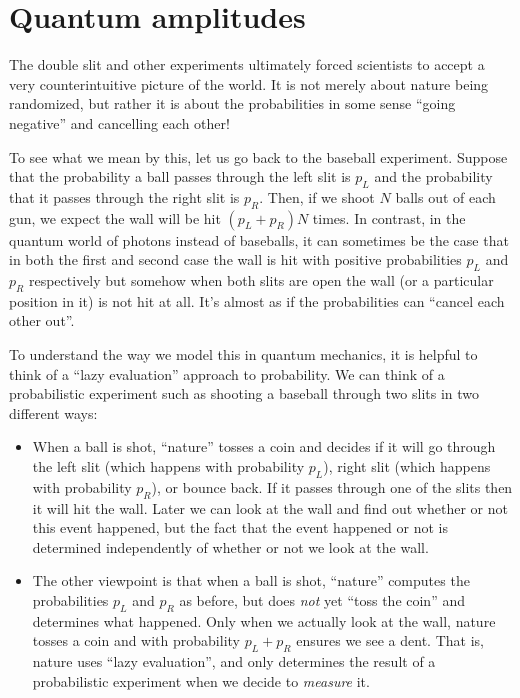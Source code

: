 \section{Quantum amplitudes}\label{Quantum-amplitudes}

The double slit and other experiments ultimately forced scientists to
accept a very counterintuitive picture of the world. It is not merely
about nature being randomized, but rather it is about the probabilities
in some sense ``going negative'' and cancelling each other!

To see what we mean by this, let us go back to the baseball experiment.
Suppose that the probability a ball passes through the left slit is
\(p_L\) and the probability that it passes through the right slit is
\(p_R\). Then, if we shoot \(N\) balls out of each gun, we expect the
wall will be hit \((p_L+p_R)N\) times. In contrast, in the quantum world
of photons instead of baseballs, it can sometimes be the case that in
both the first and second case the wall is hit with positive
probabilities \(p_L\) and \(p_R\) respectively but somehow when both
slits are open the wall (or a particular position in it) is not hit at
all. It's almost as if the probabilities can ``cancel each other out''.

To understand the way we model this in quantum mechanics, it is helpful
to think of a ``lazy evaluation'' approach to probability. We can think
of a probabilistic experiment such as shooting a baseball through two
slits in two different ways:

\begin{itemize}
\item
  When a ball is shot, ``nature'' tosses a coin and decides if it will
  go through the left slit (which happens with probability \(p_L\)),
  right slit (which happens with probability \(p_R\)), or bounce back.
  If it passes through one of the slits then it will hit the wall. Later
  we can look at the wall and find out whether or not this event
  happened, but the fact that the event happened or not is determined
  independently of whether or not we look at the wall.
\item
  The other viewpoint is that when a ball is shot, ``nature'' computes
  the probabilities \(p_L\) and \(p_R\) as before, but does \emph{not}
  yet ``toss the coin'' and determines what happened. Only when we
  actually look at the wall, nature tosses a coin and with probability
  \(p_L+p_R\) ensures we see a dent. That is, nature uses ``lazy
  evaluation'', and only determines the result of a probabilistic
  experiment when we decide to \emph{measure} it.
\end{itemize}


